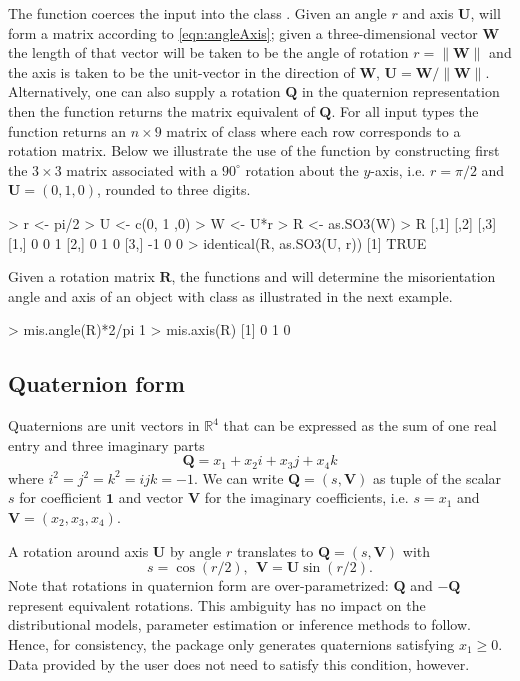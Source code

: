 The  function coerces the input into the class .  Given an angle $r$ and axis $\bm U$,  will form a matrix according to \eqref{eqn:angleAxis}; given a three-dimensional vector $\bm W$ the length of that vector will be taken to be the angle of rotation $r=\|\bm W\|$ and the axis is taken to be the unit-vector in the direction of $\bm W$, $\bm U=\bm W/\|\bm W\|$.  Alternatively, one can also supply a rotation $\bm Q$ in the quaternion representation then the  function returns the matrix equivalent of $\bm Q$.  For all input types the function  returns an $n\times9$ matrix of class  where each row corresponds to a rotation matrix.    Below we illustrate the use of the  function by constructing first the $3\times3$ matrix associated with a $90^\circ$ rotation about the $y$-axis, i.e. $r=\pi/2$ and $\bm U=(0,1,0)$, rounded to three digits.

\begin{example}
> r <- pi/2
> U <- c(0, 1 ,0)
> W <- U*r
> R <- as.SO3(W)
> R
     [,1] [,2] [,3]
[1,]    0    0    1
[2,]    0    1    0
[3,]   -1    0    0
> identical(R, as.SO3(U, r))
[1] TRUE
\end{example}

Given a rotation matrix $\bm R$, the functions  and  will determine the misorientation angle and axis of an object with class  as illustrated in the next example. 
\begin{example}
> mis.angle(R)*2/pi
1
> mis.axis(R)
[1] 0 1 0
\end{example}

\subsection{Quaternion form}

Quaternions are unit vectors in $\mathbb{R}^4$ that can be expressed as the sum of one real entry and three imaginary parts
\begin{equation}\label{eqn:quat}
\bm Q = x_1 + x_2 i + x_3 j + x_4 k
\end{equation}
where $i^2 = j^2= k^2 =ijk= -1$.  We can write $\bm Q=(s,\bm V)$ as tuple of the scalar $s$ for coefficient $\bm 1$ and vector $\bm V$ for the imaginary coefficients, i.e. $s=x_1$ and $\bm V= (x_2, x_3, x_4)$.

A rotation around axis $\bm U$ by angle $r$ translates to $\bm Q=(s,\bm V)$ with
\[
s = \cos{(r/2)},  \ \ \bm V = \bm U \sin {(r/2)}.
\]
Note that rotations in quaternion form are over-parametrized: $\bm Q$ and $-\bm Q$ represent equivalent rotations.  This ambiguity has no impact on the distributional models, parameter estimation or inference methods to follow.  Hence, for consistency, the  package only generates quaternions satisfying $x_1\geq0$.  Data provided by the user does not need to satisfy this condition, however.


